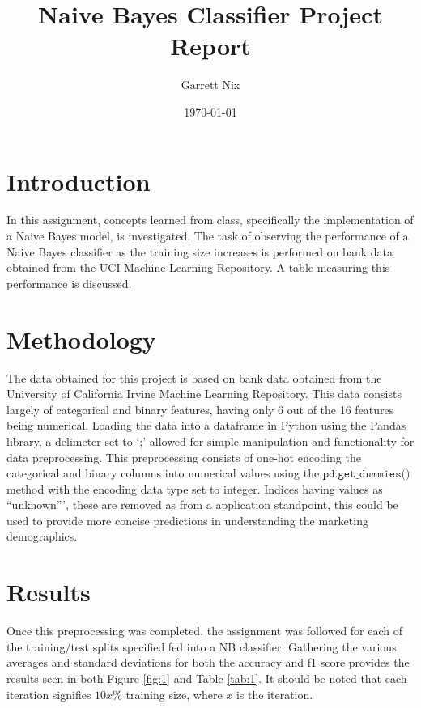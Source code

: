 \documentclass[12pt]{article}
\title{Naive Bayes Classifier Project Report}
\author{Garrett Nix}
\date{\today}
\theoremstyle{definition}
\begin{document}
\maketitle
\vspace{-2em}  %
\section{Introduction}
In this assignment, concepts learned from class, specifically the implementation of a Naive Bayes model, is investigated.
The task of observing the performance of a Naive Bayes classifier as the training size increases is performed on bank data obtained from the UCI Machine Learning Repository. 
A table measuring this performance is discussed.

\section{Methodology}
The data obtained for this project is based on bank data obtained from the University of California Irvine Machine Learning Repository.
This data consists largely of categorical and binary features, having only 6 out of the 16 features being numerical. Loading the data into a dataframe in Python using the Pandas library, 
a delimeter set to `;' allowed for simple manipulation and functionality for data preprocessing. This preprocessing consists of one-hot encoding the categorical and binary columns into numerical values using the $\texttt{pd.get\_dummies()}$ method with the encoding data type set to integer. Indices having values as ``unknown''', these are removed as from a application standpoint, this could be used to provide more concise predictions in understanding the marketing demographics.

\section{Results}
Once this preprocessing was completed, the assignment was followed for each of the training/test splits specified fed into a NB classifier. Gathering the various averages and standard deviations for both the accuracy and f1 score provides the results seen in both Figure \ref{fig:1} and Table \ref{tab:1}. It should be noted that each iteration signifies $10x\%$ training size, where $x$ is the iteration.
\end{document}
